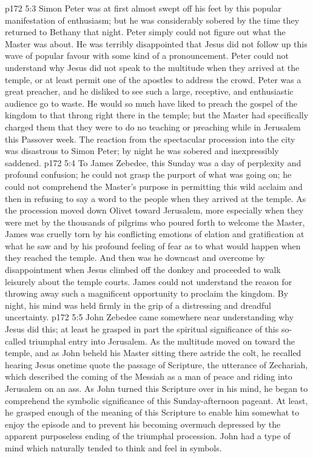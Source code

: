 \vs p172 5:3 Simon Peter was at first almost swept off his feet by this popular manifestation of enthusiasm; but he was considerably sobered by the time they returned to Bethany that night. Peter simply could not figure out what the Master was about. He was terribly disappointed that Jesus did not follow up this wave of popular favour with some kind of a pronouncement. Peter could not understand why Jesus did not speak to the multitude when they arrived at the temple, or at least permit one of the apostles to address the crowd. Peter was a great preacher, and he disliked to see such a large, receptive, and enthusiastic audience go to waste. He would so much have liked to preach the gospel of the kingdom to that throng right there in the temple; but the Master had specifically charged them that they were to do no teaching or preaching while in Jerusalem this Passover week. The reaction from the spectacular procession into the city was disastrous to Simon Peter; by night he was sobered and inexpressibly saddened.
\vs p172 5:4 To James Zebedee, this Sunday was a day of perplexity and profound confusion; he could not grasp the purport of what was going on; he could not comprehend the Master’s purpose in permitting this wild acclaim and then in refusing to say a word to the people when they arrived at the temple. As the procession moved down Olivet toward Jerusalem, more especially when they were met by the thousands of pilgrims who poured forth to welcome the Master, James was cruelly torn by his conflicting emotions of elation and gratification at what he saw and by his profound feeling of fear as to what would happen when they reached the temple. And then was he downcast and overcome by disappointment when Jesus climbed off the donkey and proceeded to walk leisurely about the temple courts. James could not understand the reason for throwing away such a magnificent opportunity to proclaim the kingdom. By night, his mind was held firmly in the grip of a distressing and dreadful uncertainty.
\vs p172 5:5 John Zebedee came somewhere near understanding why Jesus did this; at least he grasped in part the spiritual significance of this so\hyp{}called triumphal entry into Jerusalem. As the multitude moved on toward the temple, and as John beheld his Master sitting there astride the colt, he recalled hearing Jesus onetime quote the passage of Scripture, the utterance of Zechariah, which described the coming of the Messiah as a man of peace and riding into Jerusalem on an ass. As John turned this Scripture over in his mind, he began to comprehend the symbolic significance of this Sunday\hyp{}afternoon pageant. At least, he grasped enough of the meaning of this Scripture to enable him somewhat to enjoy the episode and to prevent his becoming overmuch depressed by the apparent purposeless ending of the triumphal procession. John had a type of mind which naturally tended to think and feel in symbols.

